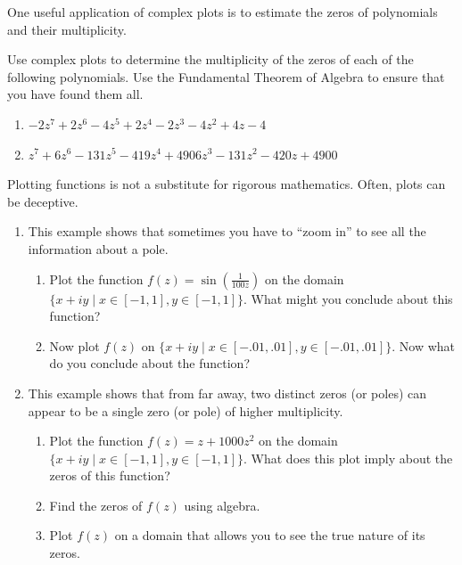 One useful application of complex plots is to estimate the zeros of polynomials and their multiplicity.

\begin{problem}\label{prob:find_roots}
Use complex plots to determine the multiplicity of the zeros of each of the following polynomials.
Use the Fundamental Theorem of Algebra to ensure that you have found them all.
\begin{enumerate}
\item $-2z^7+2z^6-4z^5+2z^4-2z^3-4z^2+4z-4$
\item $z^7 + 6z^6 - 131z^5 - 419z^4 + 4906z^3 - 131z^2 - 420z + 4900$
\end{enumerate}
\end{problem}

Plotting functions is not a substitute for rigorous mathematics. 
Often, plots can be deceptive.

\begin{problem}\label{prob:caution}
\begin{enumerate}
\item This example shows that sometimes you have to ``zoom in'' to see all the information about a pole.
\begin{enumerate}
\item Plot the function $f(z) =\sin( \frac{1}{100z})$ on the domain $\{x+iy \mid x \in [-1,1], y \in [-1,1]\}$.
What might you conclude about this function?
\item Now plot $f(z)$ on $\{x+iy \mid x \in [-.01,.01], y \in [-.01,.01]\}$.
Now what do you conclude about the function?
\end{enumerate}
\item This example shows that from far away, two distinct zeros (or poles) can appear to be a single zero (or pole) of higher multiplicity.
\begin{enumerate}
\item Plot the function $f(z) = z+1000z^2$ on the domain $\{x+iy \mid x \in [-1,1], y \in [-1,1]\}$.
What does this plot imply about the zeros of this function?
\item Find the zeros of $f(z)$ using algebra.
\item Plot $f(z)$ on a domain that allows you to see the true nature of its zeros.
\end{enumerate}
\end{enumerate}
\end{problem}




















